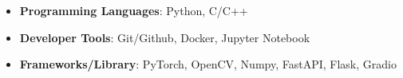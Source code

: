 
\begin{courses}
	\course
	{\begin{itemize}
	
    	\item \textbf{Programming Languages}: Python, C/C++
    	\item \textbf{Developer Tools}: Git/Github, Docker, Jupyter Notebook
            \item \textbf{Frameworks/Library}: PyTorch, OpenCV, Numpy, FastAPI, Flask, Gradio
            
         \end{itemize}}
\end{courses}
\vspace{-3mm}